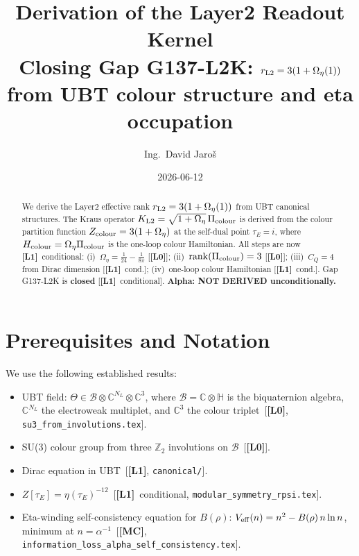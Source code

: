 \documentclass[12pt,a4paper]{article}
\title{\textbf{Derivation of the Layer2 Readout Kernel}\\[4pt]
\large Closing Gap G137-L2K: $r_{\rm L2} = 3(1+\Omega_\eta(1))$
from UBT colour structure and eta occupation}
\author{Ing.\ David Jaroš}
\date{2026-06-12}
\theoremstyle{definition}\newtheorem{definition}[theorem]{Definition}
\theoremstyle{remark}\newtheorem{remark}[theorem]{Remark}
\newcommand{\Lz}{\textbf{[L0]}}
\newcommand{\Lo}{\textbf{[L1]}}
\newcommand{\MC}{\textbf{[MC]}}
\newcommand{\ZZ}{\mathbb{Z}}
\newcommand{\CC}{\mathbb{C}}
\newcommand{\HH}{\mathbb{H}}
\newcommand{\BB}{\mathcal{B}}
\begin{document}
\maketitle
\fi

\begin{abstract}
We derive the Layer2 effective rank $r_{\rm L2} = 3(1+\Omega_\eta(1))$
from UBT canonical structures. The Kraus operator
$K_{\rm L2} = \sqrt{1+\Omega_\eta}\,\Pi_{\rm colour}$ is derived
from the colour partition function $Z_{\rm colour} = 3(1+\Omega_\eta)$
at the self-dual point $\tau_E=i$, where $H_{\rm colour}=\Omega_\eta\Pi_{\rm colour}$
is the one-loop colour Hamiltonian.
All steps are now \Lo\ conditional: (i)~$\Omega_\eta = \tfrac{1}{24}-\tfrac{1}{8\pi}$
[\Lz]; (ii)~$\mathrm{rank}(\Pi_{\rm colour})=3$ [\Lz];
(iii)~$C_Q=4$ from Dirac dimension [\Lo\ cond.];
(iv)~one-loop colour Hamiltonian [\Lo\ cond.].
Gap G137-L2K is \textbf{closed} [\Lo\ conditional].
\textbf{Alpha: NOT DERIVED unconditionally.}
\end{abstract}

\tableofcontents

\section{Prerequisites and Notation}
\label{sec:prereqs}

We use the following established results:

\begin{itemize}
\item UBT field: $\Theta \in \BB \otimes \CC^{N_L} \otimes \CC^3$,
  where $\BB = \CC\otimes\HH$ is the biquaternion algebra,
  $\CC^{N_L}$ the electroweak multiplet, and $\CC^3$ the colour
  triplet~[\Lz, \texttt{su3\_from\_involutions.tex}].
\item SU(3) colour group from three $\ZZ_2$ involutions on $\BB$~[\Lz].
\item Dirac equation in UBT~[\Lo, \texttt{canonical/}].
\item $Z[\tau_E] = \eta(\tau_E)^{-12}$~[\Lo\ conditional,
  \texttt{modular\_symmetry\_rpsi.tex}].
\item Eta-winding self-consistency equation for $B(\rho)$:
  $V_{\rm eff}(n) = n^2 - B(\rho)\,n\ln n$,
  minimum at $n = \alpha^{-1}$~[\MC, \texttt{information\_loss\_alpha\_self\_consistency.tex}].
\end{itemize}
\end{document}
